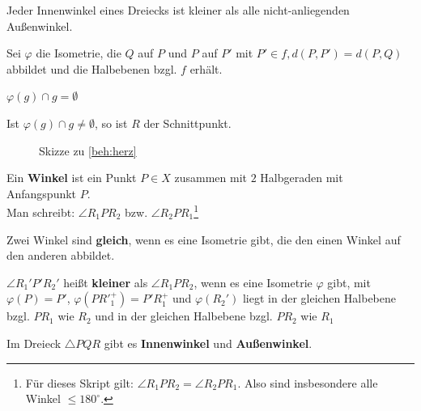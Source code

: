 \begin{bemerkung}
    Jeder Innenwinkel eines Dreiecks ist kleiner als alle nicht-anliegenden
    Außenwinkel.
\end{bemerkung}

\begin{beweis}
    Sei $\varphi$ die Isometrie, die $Q$ auf $P$ und $P$ auf $P'$
    mit $P' \in f, d(P,P') = d(P, Q)$ abbildet und die Halbebenen
    bzgl. $f$ erhält.
\end{beweis}

\begin{behauptung}[Herz]\label{beh:herz}
    $\varphi(g) \cap g = \emptyset$
\end{behauptung}

\begin{beweis}
    Ist $\varphi(g) \cap g \neq \emptyset$, so ist $R$ der Schnittpunkt.
\end{beweis}

\begin{figure}[htp]
    \centering
    
    \caption{Skizze zu \cref{beh:herz}}
    \label{fig:geometry-7}
\end{figure}

\begin{definition}\label{def:14.8}%
    \begin{defenum}
        \item \label{def:14.8a} Ein \textbf{Winkel} ist ein Punkt $P \in X$ 
              zusammen mit $2$ Halbgeraden mit Anfangspunkt $P$.\\
              Man schreibt: $\angle R_1 P R_2$ bzw. $\angle R_2 P R_1$\footnote{Für dieses Skript gilt: $\angle R_1 P R_2 = \angle R_2 P R_1$. Also sind insbesondere alle Winkel $ \leq 180^\circ$.}
        \item Zwei Winkel sind \textbf{gleich}, wenn es eine Isometrie gibt, 
              die den einen Winkel auf den anderen abbildet.
        \item \label{def:14.8c} $\angle R_1' P' R_2'$ heißt \textbf{kleiner} als
              $\angle R_1 P R_2$, wenn es eine Isometrie $\varphi$
              gibt, mit $\varphi(P) = P'$, $\varphi(PR'^{+}_{1}) = P' R_{1}^{+}$
              und $\varphi(R_2')$ liegt in der gleichen Halbebene 
              bzgl. $PR_1$ wie $R_2$ und in der gleichen Halbebene
              bzgl. $PR_2$ wie $R_1$
        \item \label{def:14.8d} Im Dreieck $\triangle PQR$ gibt es \textbf{Innenwinkel} und
              \textbf{Außenwinkel}.
    \end{defenum}
\end{definition}

